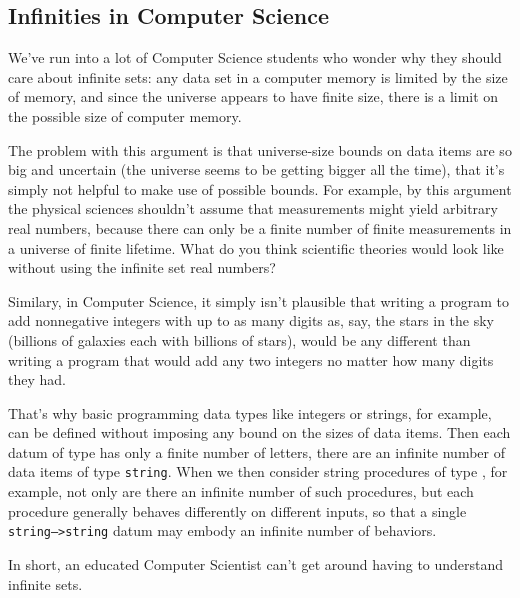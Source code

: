 \subsection{Infinities in Computer Science}

We've run into a lot of Computer Science students who wonder why they
should care about infinite sets: any data set in a computer memory is
limited by the size of memory, and since the universe appears to have
finite size, there is a limit on the possible size of computer memory.

\iffalse need to learn all this abstract theory of infinite sets, and this
is a good question.  \fi

The problem with this argument is that universe-size bounds on data items
are so big and uncertain (the universe seems to be getting bigger all the
time), that it's simply not helpful to make use of possible bounds.  For
example, by this argument the physical sciences shouldn't assume that
measurements might yield arbitrary real numbers, because there can only be
a finite number of finite measurements in a universe of finite lifetime.
What do you think scientific theories would look like without using the
infinite set real numbers?

Similary, in Computer Science, it simply isn't plausible that writing a
program to add nonnegative integers with up to as many digits as, say, the
stars in the sky (billions of galaxies each with billions of stars), would
be any different than writing a program that would add any two integers
no matter how many digits they had.

That's why basic programming data types like integers or strings, for
example, can be defined without imposing any bound on the sizes of
data items.  Then each datum of type  has only a
finite number of letters, there are an infinite number of data items
of type \texttt{string}.  When we then consider string procedures of
type , for example, not only are there
an infinite number of such procedures, but each procedure generally
behaves differently on different inputs, so that a single
\texttt{string-->string} datum may embody an infinite number of
behaviors.

In short, an educated Computer Scientist can't get around having to
understand infinite sets.

\begin{problems}

\classproblems
{}






\homeworkproblems


\end{problems}

